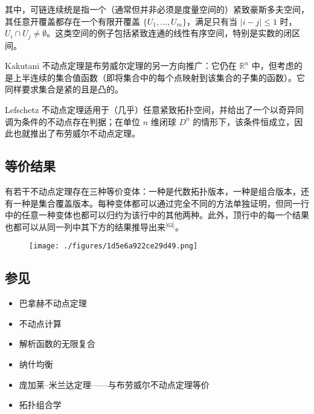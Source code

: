 其中，可链连续统是指一个（通常但并非必须是度量空间的）紧致豪斯多夫空间，其任意开覆盖都存在一个有限开覆盖 $\{U_1, \dots, U_m\}$，满足只有当 $|i - j| \leq 1$ 时，$U_i \cap U_j \neq \emptyset$。这类空间的例子包括紧致连通的线性有序空间，特别是实数的闭区间。

Kakutani 不动点定理是布劳威尔定理的另一方向推广：它仍在 $\mathbb{R}^n$ 中，但考虑的是上半连续的集合值函数（即将集合中的每个点映射到该集合的子集的函数）。它同样要求集合是紧的且是凸的。

Lefschetz 不动点定理适用于（几乎）任意紧致拓扑空间，并给出了一个以奇异同调为条件的不动点存在判据；在单位 $n$ 维闭球 $D^n$ 的情形下，该条件恒成立，因此也就推出了布劳威尔不动点定理。
\subsection{等价结果}
有若干不动点定理存在三种等价变体：一种是代数拓扑版本，一种是组合版本，还有一种是集合覆盖版本。每种变体都可以通过完全不同的方法单独证明，但同一行中的任意一种变体也都可以归约为该行中的其他两种。此外，顶行中的每一个结果也都可以从同一列中其下方的结果推导出来\(^\text{[63]}\)。
\begin{figure}[ht]
\centering
\texttt{[image: ./figures/1d5e6a922ce29d49.png]}
\caption{} \label{fig_BLWRbd_6}
\end{figure}
\subsection{参见}
\begin{itemize}
\item 巴拿赫不动点定理
\item 不动点计算
\item 解析函数的无限复合
\item 纳什均衡
\item 庞加莱–米兰达定理——与布劳威尔不动点定理等价
\item 拓扑组合学
\end{itemize}
